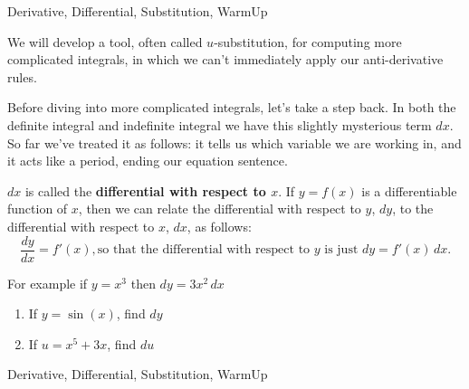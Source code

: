 \begin{tagblock}{Derivative, Differential, Substitution, WarmUp}
\begin{question}

We will develop a tool, often called $u$-substitution, for computing more complicated integrals, in which we can't immediately apply our anti-derivative rules.  

\bigskip


Before diving into more complicated integrals, let's take a step back.  In both the definite integral and indefinite integral we have this slightly mysterious term $dx$.  So far we've treated it as follows:  it tells us which variable we are working in, and it acts like a period, ending our equation sentence.  
\bigskip


$dx$ is called the \textbf{differential with respect to $x$}.  If $y=f(x)$ is a differentiable function of $x$, then we can relate the differential with respect to $y$, $dy$, to the differential with respect to $x$, $dx$, as follows:   
\[\frac{dy}{dx} = f'(x), \text{so that the differential with respect to $y$ is just $dy = f'(x) \, dx$.}\]

For example if $y=x^3$ then $dy = 3x^2 \, dx$

 
\begin{enumerate}
\item If $y=\sin(x)$, find $dy$
\vspace{1in}
\item If $u=x^5+ 3x$, find $du$
\end{enumerate}






	
	
\begin{tags}
	  Derivative, Differential, Substitution, WarmUp
\end{tags}
	
\begin{diary}
	   
\end{diary}
	
\begin{solution}
	   
	    \end{enumerate}
\end{solution}
	
\end{question}

\end{tagblock}

